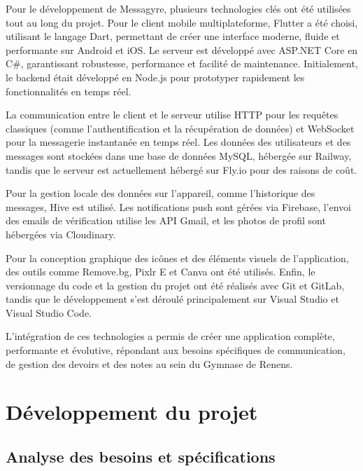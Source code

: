 \documentclass[12pt]{report}
\begin{document}
Pour le développement de Messagyre, plusieurs technologies clés ont été utilisées tout au long du projet. Pour le client mobile multiplateforme, Flutter\supercite{flutter} a été choisi, utilisant le langage Dart\supercite{dart}, permettant de créer une interface moderne, fluide et performante sur Android et iOS. Le serveur est développé avec ASP.NET Core\supercite{aspnetcore} en C\#\supercite{csharp}, garantissant robustesse, performance et facilité de maintenance. Initialement, le backend était développé en Node.js\supercite{nodejs} pour prototyper rapidement les fonctionnalités en temps réel.

La communication entre le client et le serveur utilise HTTP\supercite{http} pour les requêtes classiques (comme l'authentification et la récupération de données) et WebSocket\supercite{websocket} pour la messagerie instantanée en temps réel. Les données des utilisateurs et des messages sont stockées dans une base de données MySQL\supercite{mysql}, hébergée sur Railway\supercite{railway}, tandis que le serveur est actuellement hébergé sur Fly.io\supercite{flyio} pour des raisons de coût.

Pour la gestion locale des données sur l'appareil, comme l'historique des messages, Hive\supercite{hive} est utilisé. Les notifications push sont gérées via Firebase\supercite{firebase}, l'envoi des emails de vérification utilise les API Gmail\supercite{gmailapi}, et les photos de profil sont hébergées via Cloudinary\supercite{cloudinary}.

Pour la conception graphique des icônes et des éléments visuels de l'application, des outils comme Remove.bg\supercite{removebg}, Pixlr E\supercite{pixlre} et Canva\supercite{canva} ont été utilisés. Enfin, le versionnage du code et la gestion du projet ont été réalisés avec Git\supercite{git} et GitLab\supercite{gitlab}, tandis que le développement s'est déroulé principalement sur Visual Studio\supercite{visualstudio} et Visual Studio Code\supercite{vscode}.

L'intégration de ces technologies a permis de créer une application complète, performante et évolutive, répondant aux besoins spécifiques de communication, de gestion des devoirs et des notes au sein du Gymnase de Renens.

\chapter{Développement du projet}

\section{Analyse des besoins et spécifications}
\end{document}
